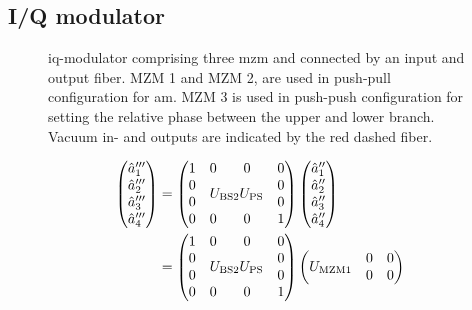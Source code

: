 \subsection{I/Q modulator}

\begin{figure}[htb]
	\centering
	
	\caption{\gls{iq}-modulator comprising three \gls{mzm} and connected by an input and output fiber. MZM 1 and MZM 2, are used in push-pull configuration for \gls{am}. MZM 3 is used in push-push configuration for setting the relative phase between the upper and lower branch. Vacuum in- and outputs are indicated by the red dashed fiber.}
\end{figure}

\begin{equation}
	\begin{split}
		\begin{pmatrix}
			\hat{a}_1^{\prime\prime\prime} \\
			\hat{a}_2^{\prime\prime\prime} \\
			\hat{a}_3^{\prime\prime\prime} \\
			\hat{a}_4^{\prime\prime\prime}
		\end{pmatrix}
		&=
		\begin{pmatrix}
			 1 & 0 & 0 & 0 \\
			 0 & \multicolumn{2}{c}{\multirow{2}{*}{$U_\text{BS2}U_\text{PS}$}} & 0 \\
			 0 & & & 0 \\
			 0 & 0 & 0 & 1
		\end{pmatrix}
		\begin{pmatrix}
			\hat{a}_1^{\prime\prime} \\
			\hat{a}_2^{\prime\prime} \\
			\hat{a}_3^{\prime\prime} \\
			\hat{a}_4^{\prime\prime}
		\end{pmatrix}
		\\
		&=
		\begin{pmatrix}
			 1 & 0 & 0 & 0 \\
			 0 & \multicolumn{2}{c}{\multirow{2}{*}{$U_\text{BS2}U_\text{PS}$}} & 0 \\
			 0 & & & 0 \\
			 0 & 0 & 0 & 1
		\end{pmatrix}
		\begin{pmatrix}
			 \multicolumn{2}{c}{\multirow{2}{*}{$U_\text{MZM1}$}} & 0 & 0 \\
			 & & 0 & 0 \\

\end{pmatrix}
\end{split}
\end{equation}
